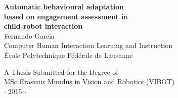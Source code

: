 
\newpage
\thispagestyle{empty}


\vspace*{2cm}
\begin{center}
{\Large\bf Automatic behavioural adaptation\\
			based on engagement assessment in\\
			child-robot interaction\\} \vspace{2cm} {\large
Fernando Garcia\\
\vspace{2cm}
Computer Human Interaction Learning and Instruction \\
\'Ecole Polytechnique F\'ed\'erale de Lausanne}

\end{center}

\vspace{7cm}
\begin{center}
{\large A Thesis Submitted for the Degree of \\MSc Erasmus Mundus
in Vision and Robotics (VIBOT) \\\vspace{0.3cm} $\cdot$ 2015
$\cdot$}
\end{center}
\singlespacing


